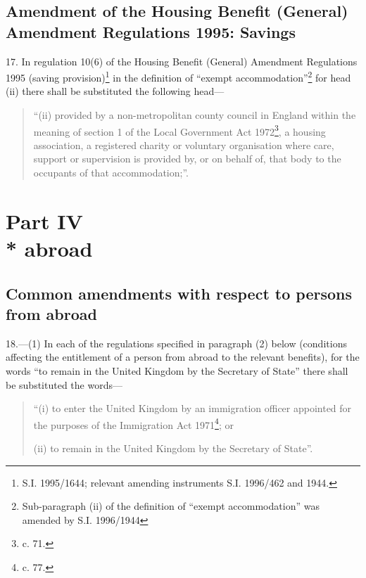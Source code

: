 \documentclass[12pt,a4paper]{article}
\begin{document}
\subsection[17. Amendment of the Housing Benefit (General) Amendment Regulations 1995: Savings]{Amendment of the Housing Benefit (General) Amendment Regulations 1995: Savings}

17.  In regulation 10(6) of the Housing Benefit (General) Amendment Regulations 1995 (saving provision)\footnote{\frenchspacing S.I. 1995/1644; relevant amending instruments S.I. 1996/462 and 1944.} in the definition of “exempt accommodation”\footnote{\frenchspacing Sub-paragraph (ii) of the definition of “exempt accommodation” was amended by S.I. 1996/1944} for head (ii)  there shall be substituted the following head—
\begin{quotation}
“(ii) provided by a non-metropolitan county council in England within the meaning of section 1 of the Local Government Act 1972\footnote{ c. 71.}, a housing association, a registered charity or voluntary organisation where care, support or supervision is provided by, or on behalf of, that body to the occupants of that accommodation;”.
\end{quotation}

\section[Part IV --- Amendments with respect to persons from abroad]{\sloppy Part IV\\* abroad}

\renewcommand\parthead{--- Part IV}

\subsection[18. Common amendments with respect to persons from abroad]{Common amendments with respect to persons from abroad}

18.---(1)  In each of the regulations specified in paragraph (2) below (conditions affecting the entitlement of a person from abroad to the relevant benefits), for the words “to remain in the United Kingdom by the Secretary of State” there shall be substituted the words—
\begin{quotation}
“(i) to enter the United Kingdom by an immigration officer appointed for the purposes of the Immigration Act 1971\footnote{ c. 77.}; or

(ii) to remain in the United Kingdom by the Secretary of State”.
\end{quotation}
\end{document}
